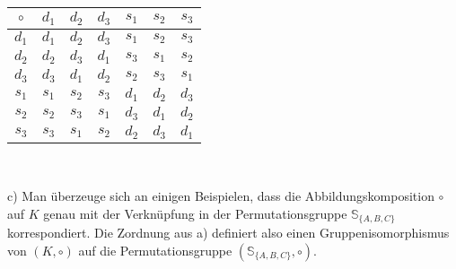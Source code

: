 \begin{table}[h]
\centering
\begin{tabular}{c|cccccc}
$\circ$ & $d_1$ & $d_2$ & $d_3$ & $s_1$ & $s_2$ & $s_3$\\
\hline
$d_1$ & $d_1$ & $d_2$ & $d_3$ & $s_1$ & $s_2$ & $s_3$\\
$d_2$ & $d_2$ & $d_3$ & $d_1$ & $s_3$ & $s_1$ & $s_2$\\
$d_3$ & $d_3$ & $d_1$ & $d_2$ & $s_2$ & $s_3$ & $s_1$\\
$s_1$ & $s_1$ & $s_2$ & $s_3$ & $d_1$ & $d_2$ & $d_3$\\
$s_2$ & $s_2$ & $s_3$ & $s_1$ & $d_3$ & $d_1$ & $d_2$\\
$s_3$ & $s_3$ & $s_1$ & $s_2$ & $d_2$ & $d_3$ & $d_1$\\
\end{tabular}
\end{table}\

c) Man überzeuge sich an einigen Beispielen, dass die Abbildungskomposition $\circ$ auf $K$ genau mit der Verknüpfung in der Permutationsgruppe $\mathbb{S}_{\{A,B,C\}}$ korrespondiert. Die Zordnung aus a) definiert also einen Gruppenisomorphismus von $(K, \circ)$ auf die Permutationsgruppe $(\mathbb{S}_{\{A,B,C\}}, \circ)$.\\

\newpage





